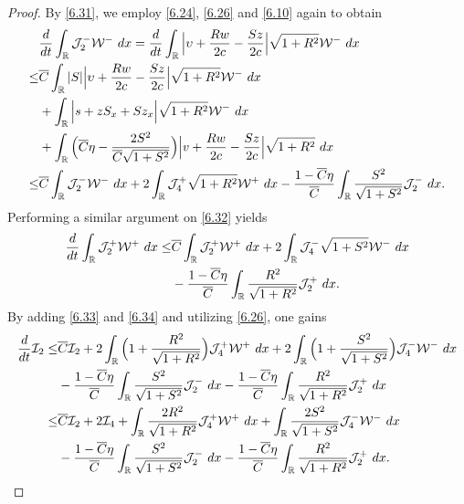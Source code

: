 \documentclass[10pt,a4paper]{amsart}
\newcommand{\fr}{\frac}
\begin{document}
\begin{proof}
By \eqref{6.31}, we employ \eqref{6.24}, \eqref{6.26} and \eqref{6.10} again to obtain
\begin{align}\label{6.33}
\begin{split}
&\fr{{\rm d}}{{\rm d}t}\int_{\mathbb{R}} \mathcal{J}_{2}^-\mathcal{W}^-\ {\rm d}x=\fr{{\rm d}}{{\rm d}t}\int_{\mathbb{R}} \Big|\upsilon+\fr{Rw}{2c}-\fr{Sz}{2c}\Big|\sqrt{1+R^2}\mathcal{W}^-\ {\rm d}x \\
\leq & \overline{C}\int_{\mathbb{R}}  |S|\Big|\upsilon+\fr{Rw}{2c}-\fr{Sz}{2c}\Big|\sqrt{1+R^2}\mathcal{W}^-\ {\rm d}x \\
&+\int_{\mathbb{R}}  \Big|s+zS_x+Sz_x\Big|\sqrt{1+R^2}\mathcal{W}^-\ {\rm d}x \\
&+\int_{\mathbb{R}}  \Big(\overline{C}\eta-\fr{2S^2}{\overline{C}\sqrt{1+S^2}}\Big) \Big|v+\fr{Rw}{2c}-\fr{Sz}{2c}\Big|\sqrt{1+R^2}\ {\rm d}x
\\
\leq & \overline{C}\int_{\mathbb{R}}  \mathcal{J}_{2}^-\mathcal{W}^-\ {\rm d}x  +2\int_{\mathbb{R}}  \mathcal{J}_{4}^+\sqrt{1+R^2}\mathcal{W}^+\ {\rm d}x  -\fr{1-\overline{C}\eta}{\overline{C}}\int_{\mathbb{R}}  \fr{S^2}{\sqrt{1+S^2}} \mathcal{J}_{2}^-\ {\rm d}x.
\end{split}
\end{align}
Performing a similar argument on \eqref{6.32} yields
\begin{align}\label{6.34}
\begin{split}
\fr{{\rm d}}{{\rm d}t}\int_{\mathbb{R}} \mathcal{J}_{2}^+\mathcal{W}^+\ {\rm d}x
\leq & \overline{C}\int_{\mathbb{R}}  \mathcal{J}_{2}^+\mathcal{W}^+\ {\rm d}x  +2\int_{\mathbb{R}}  \mathcal{J}_{4}^-\sqrt{1+S^2}\mathcal{W}^-\ {\rm d}x  \\ &-\fr{1-\overline{C}\eta}{\overline{C}}\int_{\mathbb{R}}  \fr{R^2}{\sqrt{1+R^2}} \mathcal{J}_{2}^+\ {\rm d}x.
\end{split}
\end{align}
By adding \eqref{6.33} and \eqref{6.34} and utilizing \eqref{6.26}, one gains
\begin{align}\label{6.35}
\begin{split}
\fr{{\rm d}}{{\rm d}t}\mathcal{I}_2
\leq & \overline{C}\mathcal{I}_2  +2\int_{\mathbb{R}}  \Big(1+\fr{R^2}{\sqrt{1+R^2}}\Big)\mathcal{J}_{4}^+\mathcal{W}^+\ {\rm d}x  +2\int_{\mathbb{R}}  \Big(1+\fr{S^2}{\sqrt{1+S^2}}\Big)\mathcal{J}_{4}^-\mathcal{W}^-\ {\rm d}x  \\ &-\fr{1-\overline{C}\eta}{\overline{C}}\int_{\mathbb{R}}  \fr{S^2}{\sqrt{1+S^2}} \mathcal{J}_{2}^-\ {\rm d}x -\fr{1-\overline{C}\eta}{\overline{C}}\int_{\mathbb{R}}  \fr{R^2}{\sqrt{1+R^2}} \mathcal{J}_{2}^+\ {\rm d}x \\
\leq &\overline{C}\mathcal{I}_2  +2\mathcal{I}_4  +\int_{\mathbb{R}}  \fr{2R^2}{\sqrt{1+R^2}}\mathcal{J}_{4}^+\mathcal{W}^+\ {\rm d}x  +\int_{\mathbb{R}}  \fr{2S^2}{\sqrt{1+S^2}}\mathcal{J}_{4}^-\mathcal{W}^-\ {\rm d}x  \\ &-\fr{1-\overline{C}\eta}{\overline{C}}\int_{\mathbb{R}}  \fr{S^2}{\sqrt{1+S^2}} \mathcal{J}_{2}^-\ {\rm d}x -\fr{1-\overline{C}\eta}{\overline{C}}\int_{\mathbb{R}}  \fr{R^2}{\sqrt{1+R^2}} \mathcal{J}_{2}^+\ {\rm d}x.
\end{split}
\end{align}


\end{proof}
\end{document}
